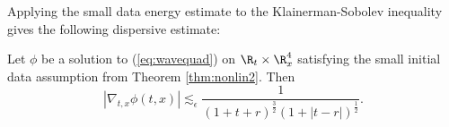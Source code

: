Applying the small data energy estimate to the Klainerman-Sobolev inequality gives the following dispersive estimate:

\begin{corollary}
	Let $\phi$ be a solution to (\ref{eq:wavequad}) on $\R_t \times \R^4_x$ satisfying the small initial data assumption from Theorem \ref{thm:nonlin2}. Then 
		\[ |\nabla_{t, x} \phi (t, x)| \lesssim_\epsilon \frac{1}{(1 + t + r)^\frac32 (1 + |t - r|)^\frac12}.  \]
\end{corollary}